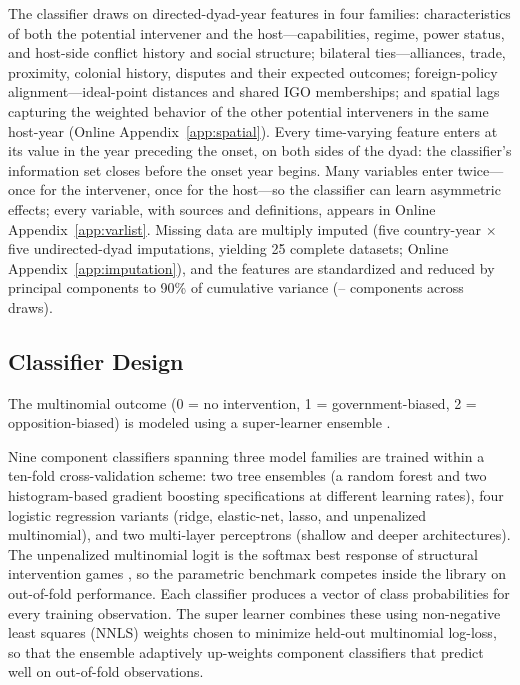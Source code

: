 The classifier draws on \FeatXW{} directed-dyad-year features in four
families: characteristics of both the potential intervener and the
host---capabilities, regime, power status, and host-side conflict history and
social structure; bilateral ties---alliances, trade, proximity, colonial
history, disputes and their expected outcomes; foreign-policy
alignment---ideal-point distances and shared IGO memberships; and \FeatW{}
spatial lags capturing the weighted behavior of the other potential
interveners in the same host-year (Online Appendix~\ref{app:spatial}).  Every
time-varying feature enters at its value in the year preceding the onset, on
both sides of the dyad: the classifier's information set closes before the
onset year begins.  Many
variables enter twice---once for the intervener, once for the host---so the
classifier can learn asymmetric effects; every variable, with sources and
definitions, appears in Online Appendix~\ref{app:varlist}.  Missing data are
multiply imputed (five country-year $\times$ five undirected-dyad
imputations, yielding 25 complete datasets; Online
Appendix~\ref{app:imputation}), and the features are standardized and
reduced by principal components to 90\% of cumulative variance
(\PCAxwLo--\PCAxwHi{} components across draws).

\subsection{Classifier Design}

The multinomial outcome (0 = no intervention, 1 = government-biased,
2 = opposition-biased) is modeled using a super-learner ensemble
\citep{vanderlaan2007}.

Nine component classifiers spanning three model families are trained
within a ten-fold cross-validation scheme: two tree ensembles (a random
forest and two histogram-based gradient boosting
specifications at different learning rates), four logistic regression variants (ridge,
elastic-net, lasso, and unpenalized multinomial), and two multi-layer
perceptrons (shallow and deeper architectures).  The unpenalized
multinomial logit is the softmax best response of structural intervention
games \citep{gibilisco2022}, so the parametric benchmark competes inside the
library on out-of-fold performance.  Each classifier produces a vector of
class probabilities for every training observation.  The super learner combines these using
non-negative least squares (NNLS) weights chosen to minimize held-out
multinomial log-loss, so that the ensemble adaptively up-weights
component classifiers that predict well on out-of-fold observations.

